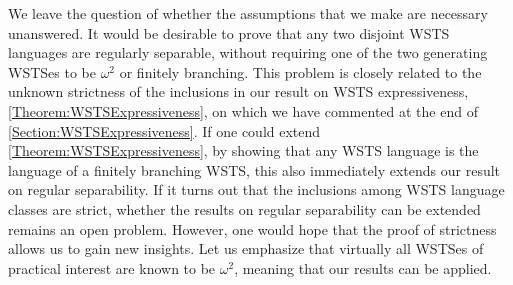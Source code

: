 \documentclass[../../diss.tex]{subfiles}
\begin{document}
We leave the question of whether the assumptions that we make are necessary unanswered.
It would be desirable to prove that any two disjoint WSTS languages are regularly separable, without requiring one of the two generating WSTSes to be $\omega^2$ or finitely branching.
This problem is closely related to the unknown strictness of the inclusions in our result on WSTS expressiveness, \cref{Theorem:WSTSExpressiveness}, on which we have commented at the end of \cref{Section:WSTSExpressiveness}.
If one could extend \cref{Theorem:WSTSExpressiveness}, \eg by showing that any WSTS language is the language of a finitely branching WSTS, this also immediately extends our result on regular separability.
If it turns out that the inclusions among WSTS language classes are strict, whether the results on regular separability can be extended remains an open problem.
However, one would hope that the proof of strictness allows us to gain new insights.
Let us emphasize that virtually all WSTSes of practical interest are known to be $\omega^2$, meaning that our results can be applied.
\end{document}
